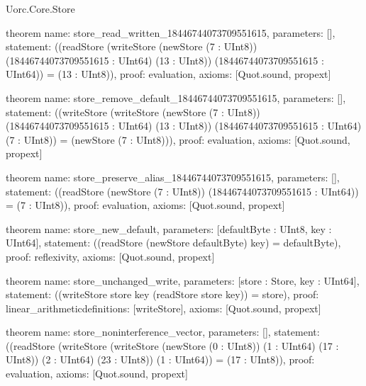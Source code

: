 \begin{lexlean}{Uorc.Core.Store}
\begin{semanticmodule}
theorem{
  name: store_read_written_18446744073709551615,
  parameters: [],
  statement: ((readStore (writeStore (newStore (7 : UInt8)) (18446744073709551615 : UInt64) (13 : UInt8)) (18446744073709551615 : UInt64)) = (13 : UInt8)),
  proof: evaluation{},
  axioms: [Quot.sound, propext]
}

theorem{
  name: store_remove_default_18446744073709551615,
  parameters: [],
  statement: ((writeStore (writeStore (newStore (7 : UInt8)) (18446744073709551615 : UInt64) (13 : UInt8)) (18446744073709551615 : UInt64) (7 : UInt8)) = (newStore (7 : UInt8))),
  proof: evaluation{},
  axioms: [Quot.sound, propext]
}

theorem{
  name: store_preserve_alias_18446744073709551615,
  parameters: [],
  statement: ((readStore (newStore (7 : UInt8)) (18446744073709551615 : UInt64)) = (7 : UInt8)),
  proof: evaluation{},
  axioms: [Quot.sound, propext]
}

theorem{
  name: store_new_default,
  parameters: [defaultByte : UInt8, key : UInt64],
  statement: ((readStore (newStore defaultByte) key) = defaultByte),
  proof: reflexivity{},
  axioms: [Quot.sound, propext]
}

theorem{
  name: store_unchanged_write,
  parameters: [store : Store, key : UInt64],
  statement: ((writeStore store key (readStore store key)) = store),
  proof: linear_arithmetic{definitions: [writeStore]},
  axioms: [Quot.sound, propext]
}

theorem{
  name: store_noninterference_vector,
  parameters: [],
  statement: ((readStore (writeStore (writeStore (newStore (0 : UInt8)) (1 : UInt64) (17 : UInt8)) (2 : UInt64) (23 : UInt8)) (1 : UInt64)) = (17 : UInt8)),
  proof: evaluation{},
  axioms: [Quot.sound, propext]
}
\end{semanticmodule}
\end{lexlean}
